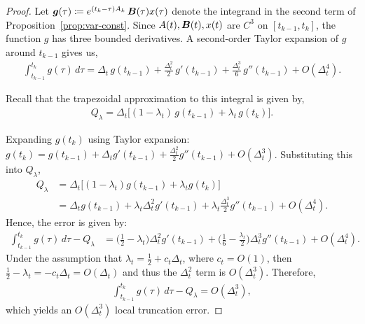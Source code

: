 \begin{proof}
Let ${\bm{g}}(\tau) \coloneqq e^{(t_k-\tau) A_k}\,{\bm{B}}(\tau)x(\tau)$ denote the 
integrand in the second term of Proposition~\ref{prop:var-const}.  
Since $A(t),{\bm{B}}(t),x(t)$ are $C^3$ on $[t_{k-1},t_k]$, the function $g$ has three
bounded derivatives.  
A second-order Taylor expansion of $g$ around $t_{k-1}$ gives us,
\begin{align*}
\int_{t_{k-1}}^{t_k} g(\tau)\,d\tau
=
\Delta_t\, g(t_{k-1})
+ \frac{\Delta_t^2}{2}\, g'(t_{k-1})
+ \frac{\Delta_t^3}{6}\, g''(t_{k-1})
+ O(\Delta_t^4).
\end{align*}

Recall that the trapezoidal approximation to this integral is given by,
\begin{align*}
    Q_\lambda
    =
    \Delta_t \Big[(1-\lambda_t)\, g(t_{k-1})
    + \lambda_t\, g(t_k)\Big].
\end{align*}

Expanding $g(t_k)$ using Taylor expansion:
$
g(t_k)
= g(t_{k-1}) + \Delta_t g'(t_{k-1})
+ \frac{\Delta_t^2}{2} g''(t_{k-1}) + O(\Delta_t^3)
$.
Substituting this into $Q_\lambda$,
\begin{align*}
Q_\lambda
&= \Delta_t\Big[(1-\lambda_t) g(t_{k-1})
    + \lambda_t g(t_k)\Big] \\
&= \Delta_t g(t_{k-1})
  + \lambda_t \Delta_t^2 g'(t_{k-1})
  + \lambda_t \frac{\Delta_t^3}{2} g''(t_{k-1})
  + O(\Delta_t^4).
\end{align*}
Hence, the error is given by:
\begin{align*}
\int_{t_{k-1}}^{t_k} g(\tau)\,d\tau - Q_\lambda
&= \Big(\tfrac{1}{2} - \lambda_t\Big)\Delta_t^2 g'(t_{k-1})
 + \Big(\tfrac{1}{6} - \tfrac{\lambda_t}{2}\Big)\Delta_t^3 g''(t_{k-1})
 + O(\Delta_t^4).
\end{align*}
Under the assumption that $\lambda_t = \tfrac{1}{2} + c_t \Delta_t$, where $c_t = O(1)$, then
$\tfrac{1}{2} - \lambda_t = -c_t \Delta_t = O(\Delta_t)$ and thus the
$\Delta_t^2$ term is $O(\Delta_t^3)$. Therefore,
\begin{align*}
    \int_{t_{k-1}}^{t_k} g(\tau)\,d\tau - Q_\lambda = O(\Delta_t^3),
\end{align*}
which yields an $O(\Delta_t^3)$ local truncation error. 
\end{proof}

